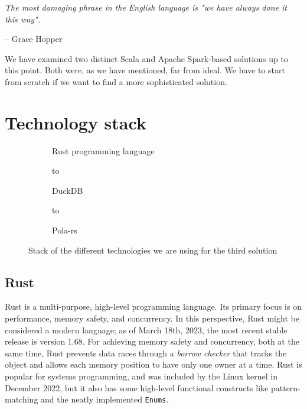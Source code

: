 \epigraph{\textit{The most damaging phrase in the English language is "we have always done it this way".}}{-- \textup{Grace Hopper}}

We have examined two distinct Scala and Apache Spark-based solutions up to this point. Both were, as we have mentioned, far from ideal. We have to start from scratch if we want to find a more sophisticated solution.

\section{Technology stack}

\begin{figure}[ht]
    \centering
    \newsavebox\mybox
    \begin{subfigure}{.3\textwidth}
        \centering
        \usebox{\mybox}
        \caption{Rust programming language}
    \end{subfigure}%
    \hspace*{0.1em}
    \begin{subfigure}{.3\textwidth}
        \centering
        \vbox to \ht{}
        \caption{DuckDB}
    \end{subfigure}%
    \hspace*{0.1em}
    \begin{subfigure}{.3\textwidth}
        \centering
        \vbox to \ht{}
        \caption{Pola-rs}
    \end{subfigure}%
    \caption{Stack of the different technologies we are using for the third solution}
\end{figure}

\subsection{Rust}

Rust is a multi-purpose, high-level programming language. Its primary focus is on performance, memory safety, and concurrency. In this perspective, Rust might be considered a modern language; as of March 18th, 2023, the most recent stable release is version 1.68. For achieving memory safety and concurrency, both at the same time, Rust prevents data races through a \textit{borrow checker} that tracks the object and allows each memory position to have only one owner at a time. Rust is popular for systems programming, and was included by the Linux kernel in December 2022, but it also has some high-level functional constructs like pattern-matching and the neatly implemented \texttt{Enums}.

